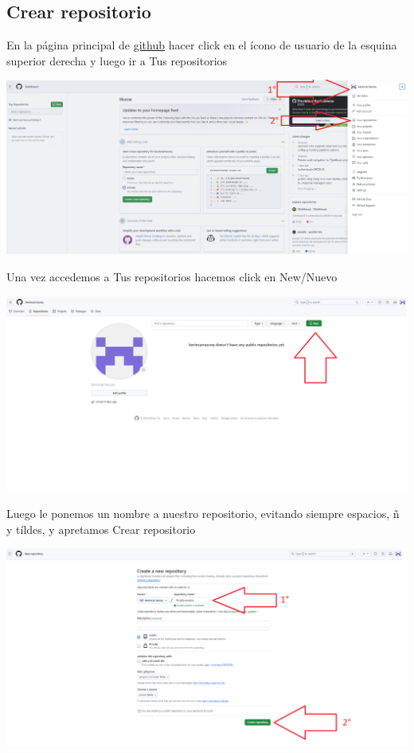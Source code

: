 \documentclass[
  letterpaper,
  DIV=11,
  numbers=noendperiod]{scrartcl}
\begin{document}
\subsection{Crear repositorio}\label{crear-repositorio}

En la página principal de \href{https://github.com/}{github} hacer click
en el ícono de usuario de la esquina superior derecha y luego ir a Tus
repositorios

\includegraphics{images/repos.png}

Una vez accedemos a Tus repositorios hacemos click en New/Nuevo

\includegraphics{images/repos2.png}

Luego le ponemos un nombre a nuestro repositorio, evitando siempre
espacios, ñ y tíldes, y apretamos Crear repositorio

\includegraphics{images/repos3.png}
\end{document}

